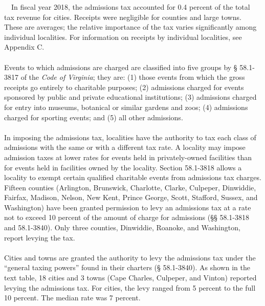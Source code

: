 \documentclass[
]{book}
\begin{document}
~~In fiscal year 2018, the admissions tax accounted for 0.4 percent of the total tax revenue for cities. Receipts were negligible for counties and large towns. These are averages; the relative importance of the tax varies significantly among individual localities. For information on receipts by individual localities, see Appendix C.\\
~\\
\hspace*{0.333em}\hspace*{0.333em}Events to which admissions are charged are classified into five groups by § 58.1-3817 of the \emph{Code of Virginia}; they are: (1) those events from which the gross receipts go entirely to charitable purposes; (2) admissions charged for events sponsored by public and private educational institutions; (3) admissions charged for entry into museums, botanical or similar gardens and zoos; (4) admissions charged for sporting events; and (5) all other admissions.\\
~\\
\hspace*{0.333em}\hspace*{0.333em}In imposing the admissions tax, localities have the authority to tax each class of admissions with the same or with a different tax rate. A locality may impose admission taxes at lower rates for events held in privately-owned facilities than for events held in facilities owned by the locality. Section 58.1-3818 allows a locality to exempt certain qualified charitable events from admissions tax charges. Fifteen counties (Arlington, Brunswick, Charlotte, Clarke, Culpeper, Dinwiddie, Fairfax, Madison, Nelson, New Kent, Prince George, Scott, Stafford, Sussex, and Washington) have been granted permission to levy an admissions tax at a rate not to exceed 10 percent of the amount of charge for admissions (§§ 58.1-3818 and 58.1-3840). Only three counties, Dinwiddie, Roanoke, and Washington, report levying the tax.\\
~\\
\hspace*{0.333em}\hspace*{0.333em}Cities and towns are granted the authority to levy the admissions tax under the ``general taxing powers'' found in their charters (§ 58.1-3840). As shown in the text table, 18 cities and 3 towns (Cape Charles, Culpeper, and Vinton) reported levying the admissions tax. For cities, the levy ranged from 5 percent to the full 10 percent. The median rate was 7 percent.
\end{document}
